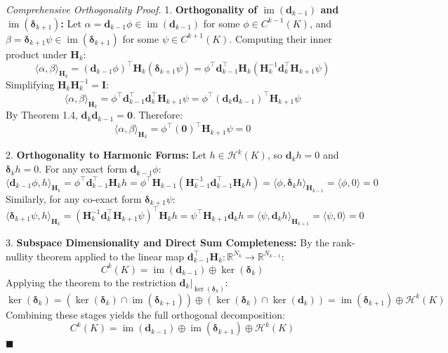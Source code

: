 \documentclass[11pt,twoside,openright]{amsbook}
\begin{document}
\textit{Comprehensive Orthogonality Proof.}  
1. \textbf{Orthogonality of $\operatorname{im}(\mathbf{d}_{k-1})$ and $\operatorname{im}(\boldsymbol{\delta}_{k+1})$:}  
   Let $\alpha = \mathbf{d}_{k-1} \phi \in \operatorname{im}(\mathbf{d}_{k-1})$ for some $\phi \in C^{k-1}(K)$, and $\beta = \boldsymbol{\delta}_{k+1} \psi \in \operatorname{im}(\boldsymbol{\delta}_{k+1})$ for some $\psi \in C^{k+1}(K)$.  
   Computing their inner product under $\mathbf{H}_k$:
   $$\langle \alpha, \beta \rangle_{\mathbf{H}_k} = (\mathbf{d}_{k-1} \phi)^\top \mathbf{H}_k (\boldsymbol{\delta}_{k+1} \psi) = \phi^\top \mathbf{d}_{k-1}^\top \mathbf{H}_k (\mathbf{H}_k^{-1} \mathbf{d}_k^\top \mathbf{H}_{k+1} \psi)$$
   Simplifying $\mathbf{H}_k \mathbf{H}_k^{-1} = \mathbf{I}$:
   $$\langle \alpha, \beta \rangle_{\mathbf{H}_k} = \phi^\top \mathbf{d}_{k-1}^\top \mathbf{d}_k^\top \mathbf{H}_{k+1} \psi = \phi^\top (\mathbf{d}_k \mathbf{d}_{k-1})^\top \mathbf{H}_{k+1} \psi$$
   By Theorem 1.4, $\mathbf{d}_k \mathbf{d}_{k-1} = \mathbf{0}$. Therefore:
   $$\langle \alpha, \beta \rangle_{\mathbf{H}_k} = \phi^\top (\mathbf{0})^\top \mathbf{H}_{k+1} \psi = 0$$

2. \textbf{Orthogonality to Harmonic Forms:}  
   Let $h \in \mathcal{H}^k(K)$, so $\mathbf{d}_k h = 0$ and $\boldsymbol{\delta}_k h = 0$.  
   For any exact form $\mathbf{d}_{k-1} \phi$:
   $$\langle \mathbf{d}_{k-1} \phi, h \rangle_{\mathbf{H}_k} = \phi^\top \mathbf{d}_{k-1}^\top \mathbf{H}_k h = \phi^\top \mathbf{H}_{k-1} (\mathbf{H}_{k-1}^{-1} \mathbf{d}_{k-1}^\top \mathbf{H}_k h) = \langle \phi, \boldsymbol{\delta}_k h \rangle_{\mathbf{H}_{k-1}} = \langle \phi, 0 \rangle = 0$$
   Similarly, for any co-exact form $\boldsymbol{\delta}_{k+1} \psi$:
   $$\langle \boldsymbol{\delta}_{k+1} \psi, h \rangle_{\mathbf{H}_k} = (\mathbf{H}_k^{-1} \mathbf{d}_k^\top \mathbf{H}_{k+1} \psi)^\top \mathbf{H}_k h = \psi^\top \mathbf{H}_{k+1} \mathbf{d}_k h = \langle \psi, \mathbf{d}_k h \rangle_{\mathbf{H}_{k+1}} = \langle \psi, 0 \rangle = 0$$

3. \textbf{Subspace Dimensionality and Direct Sum Completeness:}  
   By the rank-nullity theorem applied to the linear map $\mathbf{d}_{k-1}^\top \mathbf{H}_k : \mathbb{R}^{N_k} \to \mathbb{R}^{N_{k-1}}$:
   $$C^k(K) = \operatorname{im}(\mathbf{d}_{k-1}) \oplus \ker(\boldsymbol{\delta}_k)$$
   Applying the theorem to the restriction $\mathbf{d}_k |_{\ker(\boldsymbol{\delta}_k)}$:
   $$\ker(\boldsymbol{\delta}_k) = (\ker(\boldsymbol{\delta}_k) \cap \operatorname{im}(\boldsymbol{\delta}_{k+1})) \oplus (\ker(\boldsymbol{\delta}_k) \cap \ker(\mathbf{d}_k)) = \operatorname{im}(\boldsymbol{\delta}_{k+1}) \oplus \mathcal{H}^k(K)$$
   Combining these stages yields the full orthogonal decomposition:
   $$C^k(K) = \operatorname{im}(\mathbf{d}_{k-1}) \oplus \operatorname{im}(\boldsymbol{\delta}_{k+1}) \oplus \mathcal{H}^k(K)$$
$\blacksquare$
\end{document}
